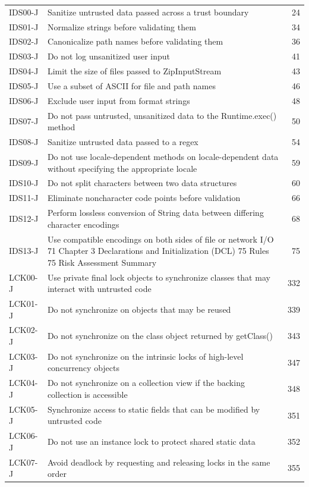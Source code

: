 \documentclass[11pt]{report}
\begin{document}
\begin{longtable}{@{}llr@{}}
IDS00-J & Sanitize untrusted data passed across a trust boundary & 24\\
IDS01-J & Normalize strings before validating them & 34\\
IDS02-J & Canonicalize path names before validating them & 36\\
IDS03-J & Do not log unsanitized user input & 41\\
IDS04-J & Limit the size of files passed to ZipInputStream & 43\\
IDS05-J & Use a subset of ASCII for file and path names & 46\\
IDS06-J & Exclude user input from format strings & 48\\
IDS07-J & Do not pass untrusted, unsanitized data to the Runtime.exec() method & 50\\
IDS08-J & Sanitize untrusted data passed to a regex & 54\\
IDS09-J & Do not use locale-dependent methods on locale-dependent data without specifying the appropriate locale & 59\\
IDS10-J & Do not split characters between two data structures & 60\\
IDS11-J & Eliminate noncharacter code points before validation & 66\\
IDS12-J & Perform lossless conversion of String data between differing character encodings & 68\\
IDS13-J & Use compatible encodings on both sides of file or network I/O 71 Chapter 3 Declarations and Initialization (DCL) 75 Rules 75 Risk Assessment Summary & 75\\
LCK00-J & Use private final lock objects to synchronize classes that may interact with untrusted code & 332\\
LCK01-J & Do not synchronize on objects that may be reused & 339\\
LCK02-J & Do not synchronize on the class object returned by getClass() & 343\\
LCK03-J & Do not synchronize on the intrinsic locks of high-level concurrency objects & 347\\
LCK04-J & Do not synchronize on a collection view if the backing collection is accessible & 348\\
LCK05-J & Synchronize access to static fields that can be modified by untrusted code & 351\\
LCK06-J & Do not use an instance lock to protect shared static data & 352\\
LCK07-J & Avoid deadlock by requesting and releasing locks in the same order & 355\\

\end{longtable}
\end{document}
